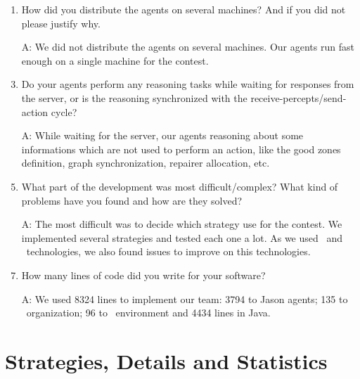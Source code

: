 \begin{enumerate}
\item How did you distribute the agents on several machines? And if you did not please justify why.
	\item[A:] We did not distribute the agents on several machines. Our agents run fast enough on a single machine for the contest.\\
	
\item Do your agents perform any reasoning tasks while waiting for responses from the server, or is the reasoning synchronized with the receive-percepts/send-action cycle?
	\item[A:] While waiting for the server, our agents reasoning about some informations which are not used to perform an action, like the good zones definition, graph synchronization, repairer allocation, etc.\\
	
\item What part of the development was most difficult/complex? What kind of problems have you found and how are they solved?
	\item[A:] The most difficult was to decide which strategy use for the contest. We implemented several strategies and tested each one a lot. As we used \moise\ and \cartago\ technologies, we also found issues to improve on this technologies.\\
		
\item How many lines of code did you write for your software?
	\item[A:] We used 8324 lines to implement our team: 3794 to Jason agents; 135 to \moise\ organization; 96 to \cartago\ environment and 4434 lines in Java. \\
	
	
\end{enumerate}

\section{Strategies, Details and Statistics}\label{sec:strategies}

